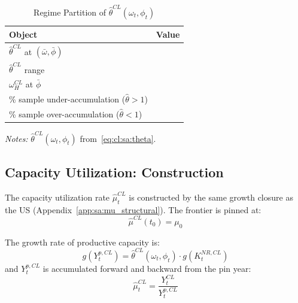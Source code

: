 \begin{table}[htbp]
\centering
\caption{Regime Partition of $\hat{\theta}^{CL}(\omega_t, \phi_t)$}
\label{tab:cl:sa:regime_summary}
\begin{threeparttable}
\begin{tabular}{lr}
	\toprule
	Object & Value \\
	\midrule
	$\hat{\theta}^{CL}$ at $(\bar{\omega}, \bar{\phi})$
	&  \\
	$\hat{\theta}^{CL}$ range &  \\
	$\omega_H^{CL}$ at $\bar{\phi}$ &  \\
	\% sample under-accumulation ($\hat{\theta} > 1$)
	&  \\
	\% sample over-accumulation ($\hat{\theta} < 1$)
	&  \\
	\bottomrule
\end{tabular}
\begin{tablenotes}
	\small
	\item \textit{Notes:}
	$\hat{\theta}^{CL}(\omega_t, \phi_t)$
	from~\eqref{eq:cl:sa:theta}.
\end{tablenotes}
\end{threeparttable}
\end{table}


\subsection{Capacity Utilization: Construction}
\label{app:cl:mu_construction}

The capacity utilization rate $\hat{\mu}_t^{CL}$ is constructed by
the same growth closure as the US
(Appendix~\ref{app:sa:mu_structural}). The frontier is pinned at:
%
\begin{equation}
\hat{\mu}^{CL}(t_0) = \mu_0
\label{eq:cl:sa:mu_pin}
\end{equation}

The growth rate of productive capacity is:
%
\begin{equation}
g(Y_t^{p,CL}) = \hat{\theta}^{CL}(\omega_t, \phi_t)
\cdot g(K_t^{NR,CL})
\label{eq:cl:sa:frontier_growth}
\end{equation}
%
and $Y_t^{p,CL}$ is accumulated forward and backward from the pin
year:
%
\begin{equation}
\hat{\mu}_t^{CL} = \frac{Y_t^{CL}}{Y_t^{p,CL}}
\label{eq:cl:sa:mu_def}
\end{equation}

